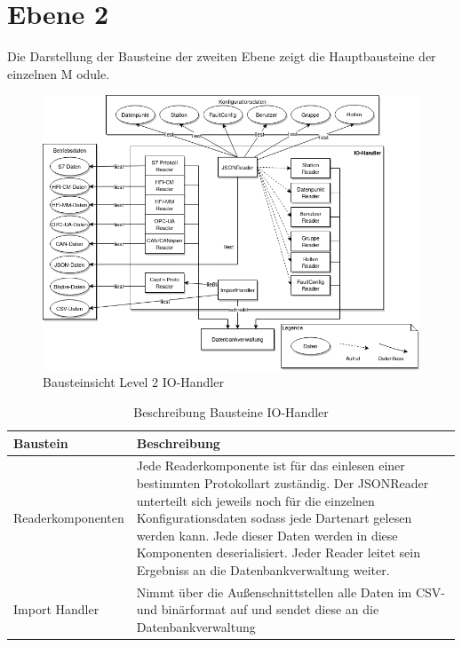 \section{Ebene 2}
Die Darstellung der Bausteine der zweiten Ebene zeigt die Hauptbausteine der einzelnen M
odule.
\begin{figure}[h]
	\centering
	\includegraphics[width=1\textwidth]{Graphics/bausteinansicht_ebene_2_IO-Modul.png}
	\caption{Bausteinsicht Level 2 IO-Handler}
	\label{fig:bausteinsichtlvl2_modulIO}
\end{figure}                 

\begin{table}[t]
	\begin{tabularx}{\textwidth}{|p{5cm}| X|}
		\hline
		Baustein & Beschreibung\\
		\hline
		Readerkomponenten & Jede Readerkomponente ist für das einlesen einer bestimmten Protokollart zuständig. Der JSONReader unterteilt sich jeweils noch für die einzelnen Konfigurationsdaten sodass jede Dartenart gelesen werden kann. Jede dieser Daten werden in diese Komponenten deserialisiert. Jeder Reader leitet sein Ergebniss an die Datenbankverwaltung weiter. \\
		\hline
		Import Handler &  Nimmt über die Außenschnittstellen alle Daten im CSV- und binärformat auf und sendet diese an die Datenbankverwaltung\\
		\hline
	\end{tabularx} 
	\caption{Beschreibung Bausteine IO-Handler}	\label{tab:IOHandlerBeschreibung}
\end{table}
